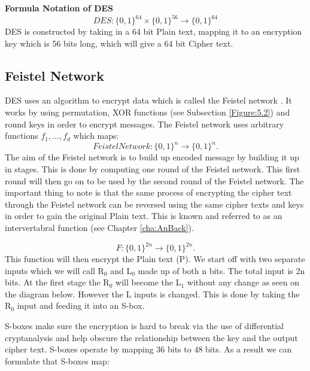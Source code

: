 \documentclass[11pt,a4paper, notitlepage]{report}
\begin{document}
\textbf{Formula Notation of DES}
\begin{displaymath}
DES: \{0,1\}^{64} \times \{0,1\}^{56} \rightarrow \{0,1\}^{64}
\end{displaymath}
DES is constructed by taking in a 64 bit Plain text, mapping it to an encryption key which is 56 bits long, which will give a 64 bit Cipher text.

\subsection{Feistel Network}
\label{subsec:FeistelNet}

DES uses an algorithm to encrypt data which is called the Feistel network \cite{DBLP:books/sp/Buchmann02}. It works by using permutation, XOR functions (see Subsection \ref{Figure:5.2}) and round keys in order to encrypt messages. The Feistel network uses arbitrary functions $f_{1},...,f_{d}$ which maps:
\begin{displaymath}
FeistelNetwork: \{0,1\}^n \rightarrow \{0,1\}^n.
\end{displaymath}
The aim of the Feistel network is to build up encoded message by building it up in stages. This is done by computing one round of the Feistel network. This first round will then go on to be used by the second round of the Feistel network. The important thing to note is that the same process of encrypting the cipher text through the Feistel network can be reversed using the same cipher texts and keys in order to gain the original Plain text. This is known and referred to as an intervertabral function (see Chapter \ref{cha:AnBack}).

\begin{displaymath}
F: \{0,1\}^{2n} \rightarrow \{0,1\}^{2n}.
\end{displaymath}
This function will then encrypt the Plain text (P). We start off with two separate inputs which we will call R$_{0}$ and L$_{0}$ made up of both n bits. The total input is 2n bits. At the first stage the R$_{0}$ will become the L$_{1}$ without any change as seen on the diagram below. However the L inputs is changed. This is done by taking the R$_{0}$ input and feeding it into an S-box. 

S-boxes make sure the encryption is hard to break via the use of differential cryptanalysis and help obscure the relationship between the key and the output cipher text. S-boxes operate by mapping 36 bits to 48 bits. As a result we can formulate that S-boxes map:
\end{document}
